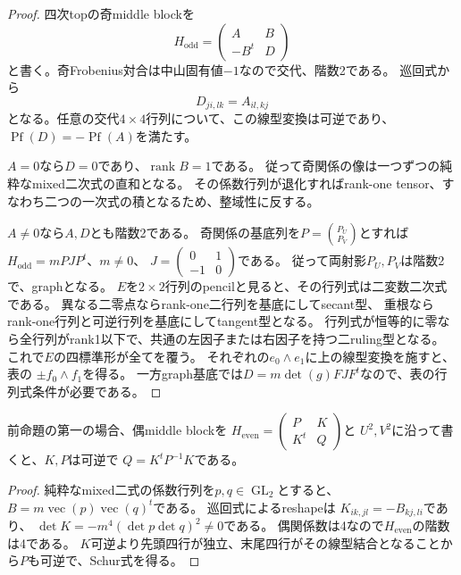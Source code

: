 \begin{proof}
四次topの奇middle blockを
\[
 H_{\mathrm{odd}}=\begin{pmatrix}A&B\\-B^t&D\end{pmatrix}
\]
と書く。奇Frobenius対合は中山固有値$-1$なので交代、階数2である。
巡回式から
\[
 D_{ji,lk}=A_{il,kj}
\]
となる。任意の交代$4\times4$行列について、この線型変換は可逆であり、
$\operatorname{Pf}(D)=-\operatorname{Pf}(A)$を満たす。

$A=0$なら$D=0$であり、$\operatorname{rank}B=1$である。
従って奇関係の像は一つずつの純粋なmixed二次式の直和となる。
その係数行列が退化すればrank-one tensor、すなわち二つの一次式の積となるため、整域性に反する。

$A\ne0$なら$A,D$とも階数2である。
奇関係の基底列を$P=\binom{P_U}{P_V}$とすれば
$H_{\mathrm{odd}}=mPJP^t$、$m\ne0$、
$J=\left(\begin{smallmatrix}0&1\\-1&0\end{smallmatrix}\right)$である。
従って両射影$P_U,P_V$は階数2で、graphとなる。
$E$を$2\times2$行列のpencilと見ると、その行列式は二変数二次式である。
異なる二零点ならrank-one二行列を基底にしてsecant型、
重根ならrank-one行列と可逆行列を基底にしてtangent型となる。
行列式が恒等的に零なら全行列がrank1以下で、共通の左因子または右因子を持つ二ruling型となる。
これで$E$の四標準形が全てを覆う。
それぞれの$e_0\wedge e_1$に上の線型変換を施すと、表の
$\pm f_0\wedge f_1$を得る。
一方graph基底では$D=m\det(g)FJF^t$なので、表の行列式条件が必要である。
\end{proof}

\begin{corollary}\label{cor:h3-order2-22-pure-mixed-schur}
前命題の第一の場合、偶middle blockを
$H_{\mathrm{even}}=\left(\begin{smallmatrix}P&K\\K^t&Q\end{smallmatrix}\right)$と
$U^2,V^2$に沿って書くと、$K,P$は可逆で
$Q=K^tP^{-1}K$である。
\end{corollary}
\begin{proof}
純粋なmixed二式の係数行列を$p,q\in\operatorname{GL}_2$とすると、
$B=m\operatorname{vec}(p)\operatorname{vec}(q)^t$である。
巡回式によるreshapeは
$K_{ik,jl}=-B_{kj,li}$であり、
$\det K=-m^4(\det p\det q)^2\ne0$である。
偶関係数は4なので$H_{\mathrm{even}}$の階数は4である。
$K$可逆より先頭四行が独立、末尾四行がその線型結合となることから$P$も可逆で、Schur式を得る。
\end{proof}

